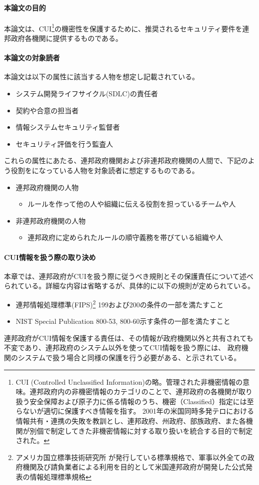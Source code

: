 \documentclass{article}[jsarticle]
\begin{document}
\paragraph{本論文の目的}本論文は、CUI\footnote{CUI (Controlled Unclassified Information)の略。管理された非機密情報の意味。連邦政府内の非機密情報のカテゴリのことで、連邦政府の各機関が取り扱う安全保障および原子力に係る情報のうち、機密（Classified）指定には至らないが適切に保護すべき情報を指す。
2001年の米国同時多発テロにおける情報共有・連携の失敗を教訓とし、連邦政府、州政府、部族政府、また各機関が別個で制定してきた非機密情報に対する取り扱いを統合する目的で制定された。
}の機密性を保護するために、推奨されるセキュリティ要件を連邦政府各機関に提供するものである。
\paragraph{本論文の対象読者}本論文は以下の属性に該当する人物を想定し記載されている。
\begin{itemize}
    \item システム開発ライフサイクル(SDLC)の責任者
    \item 契約や合意の担当者
    \item 情報システムセキュリティ監督者
    \item セキュリティ評価を行う監査人
\end{itemize}
これらの属性にあたる、連邦政府機関および非連邦政府機関の人間で、下記のよう役割をになっている人物を対象読者に想定するものである。
\begin{itemize}
    \item 連邦政府機関の人物
    \begin{itemize}
        \item ルールを作って他の人や組織に伝える役割を担っているチームや人
    \end{itemize}
    \item 非連邦政府機関の人物
    \begin{itemize}
        \item 連邦政府に定められたルールの順守義務を帯びている組織や人
    \end{itemize}
\end{itemize}
\paragraph{CUI情報を扱う際の取り決め}
本章では、連邦政府がCUIを扱う際に従うべき規則とその保護責任について述べられている。詳細な内容は省略するが、具体的に以下の規則が定められている。
\begin{itemize}
    \item 連邦情報処理標準(FIPS)\footnote{アメリカ国立標準技術研究所 が発行している標準規格で、軍事以外全ての政府機関及び請負業者による利用を目的として米国連邦政府が開発した公式発表の情報処理標準規格} 199および200の条件の一部を満たすこと
    \item NIST Special Publication 800-53, 800-60示す条件の一部を満たすこと
\end{itemize}
連邦政府がCUI情報を保護する責任は、その情報が政府機関以外と共有されても不変であり、連邦政府のシステム以外を使ってCUI情報を扱う際には、
政府機関のシステムで扱う場合と同様の保護を行う必要がある、と示されている。
\end{document}
